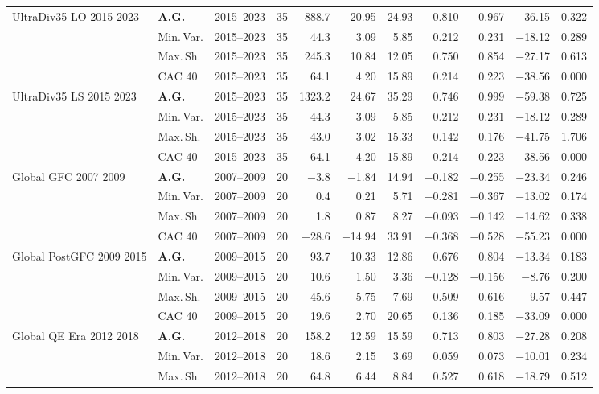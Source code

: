 \begin{longtable}{p{2.6cm} l c c r r r r r r r}
\midrule
UltraDiv35 LO 2015 2023 & \textbf{A.G.} & 2015--2023 & 35 & 888.7 & 20.95 & 24.93 & 0.810 & 0.967 & $-$36.15 & 0.322 \\
 & Min.\,Var. & 2015--2023 & 35 & 44.3 & 3.09 & 5.85 & 0.212 & 0.231 & $-$18.12 & 0.289 \\
 & Max.\,Sh. & 2015--2023 & 35 & 245.3 & 10.84 & 12.05 & 0.750 & 0.854 & $-$27.17 & 0.613 \\
 & CAC 40 & 2015--2023 & 35 & 64.1 & 4.20 & 15.89 & 0.214 & 0.223 & $-$38.56 & 0.000 \\
\midrule
UltraDiv35 LS 2015 2023 & \textbf{A.G.} & 2015--2023 & 35 & 1323.2 & 24.67 & 35.29 & 0.746 & 0.999 & $-$59.38 & 0.725 \\
 & Min.\,Var. & 2015--2023 & 35 & 44.3 & 3.09 & 5.85 & 0.212 & 0.231 & $-$18.12 & 0.289 \\
 & Max.\,Sh. & 2015--2023 & 35 & 43.0 & 3.02 & 15.33 & 0.142 & 0.176 & $-$41.75 & 1.706 \\
 & CAC 40 & 2015--2023 & 35 & 64.1 & 4.20 & 15.89 & 0.214 & 0.223 & $-$38.56 & 0.000 \\
\midrule
Global GFC 2007 2009 & \textbf{A.G.} & 2007--2009 & 20 & $-$3.8 & $-$1.84 & 14.94 & $-$0.182 & $-$0.255 & $-$23.34 & 0.246 \\
 & Min.\,Var. & 2007--2009 & 20 & 0.4 & 0.21 & 5.71 & $-$0.281 & $-$0.367 & $-$13.02 & 0.174 \\
 & Max.\,Sh. & 2007--2009 & 20 & 1.8 & 0.87 & 8.27 & $-$0.093 & $-$0.142 & $-$14.62 & 0.338 \\
 & CAC 40 & 2007--2009 & 20 & $-$28.6 & $-$14.94 & 33.91 & $-$0.368 & $-$0.528 & $-$55.23 & 0.000 \\
\midrule
Global PostGFC 2009 2015 & \textbf{A.G.} & 2009--2015 & 20 & 93.7 & 10.33 & 12.86 & 0.676 & 0.804 & $-$13.34 & 0.183 \\
 & Min.\,Var. & 2009--2015 & 20 & 10.6 & 1.50 & 3.36 & $-$0.128 & $-$0.156 & $-$8.76 & 0.200 \\
 & Max.\,Sh. & 2009--2015 & 20 & 45.6 & 5.75 & 7.69 & 0.509 & 0.616 & $-$9.57 & 0.447 \\
 & CAC 40 & 2009--2015 & 20 & 19.6 & 2.70 & 20.65 & 0.136 & 0.185 & $-$33.09 & 0.000 \\
\midrule
Global QE Era 2012 2018 & \textbf{A.G.} & 2012--2018 & 20 & 158.2 & 12.59 & 15.59 & 0.713 & 0.803 & $-$27.28 & 0.208 \\
 & Min.\,Var. & 2012--2018 & 20 & 18.6 & 2.15 & 3.69 & 0.059 & 0.073 & $-$10.01 & 0.234 \\
 & Max.\,Sh. & 2012--2018 & 20 & 64.8 & 6.44 & 8.84 & 0.527 & 0.618 & $-$18.79 & 0.512 \\

\end{longtable}
